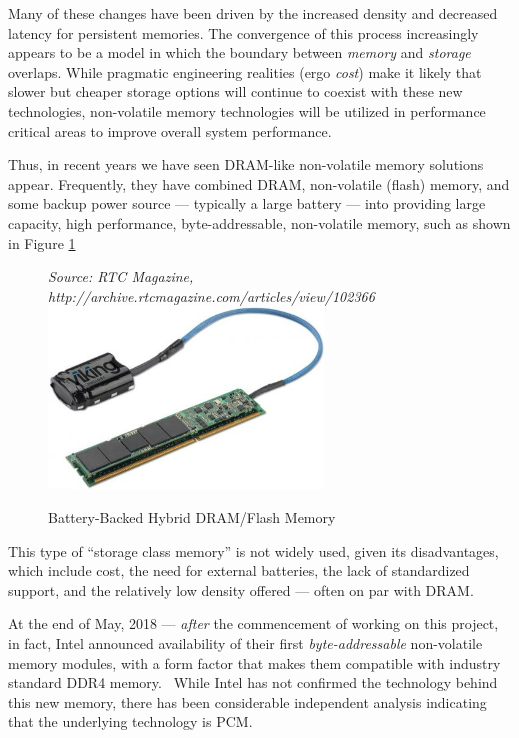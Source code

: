 Many of these changes have been driven by the increased density and decreased latency for
persistent memories. The convergence of this process increasingly appears to be a model
in which the boundary between \textit{memory} and \textit{storage} overlaps.  While
pragmatic engineering realities (ergo \textit{cost}) make it likely that slower but cheaper
storage options will continue to coexist with these new technologies, non-volatile memory
technologies will be utilized in performance critical areas to improve overall system performance.

Thus, in recent years we have seen \acs{DRAM}-like non-volatile memory solutions appear.  Frequently,
they have combined DRAM, non-volatile (flash) memory, and some backup power source ---
typically a large battery --- into providing large capacity, high performance, byte-addressable,
non-volatile memory, such as shown in Figure \ref{figure:scm}

\begin{figure}
    \centering
    \caption{Battery-Backed Hybrid DRAM/Flash Memory}\label{figure:scm}
    \emph{Source: RTC Magazine, http://archive.rtcmagazine.com/articles/view/102366}
    \includegraphics[width=0.65\textwidth]{figures/102366-2700_RTC11-PRTW-Viking-Fig1_medium.jpg}
\end{figure}

This type of ``storage class memory'' is not widely used, given its disadvantages, which include
cost, the need for external batteries, the lack of standardized support, and the relatively low
density offered --- often on par with \acs{DRAM}.

At the end of May, 2018 --- \textit{after} the commencement of working on this project, in fact,
Intel announced availability of their first \textit{byte-addressable} non-volatile memory modules,
with a form factor that makes them compatible with industry standard \acs{DDR4} 
memory.~\cite{anandtech:apache_pass}  While Intel has not confirmed the technology behind this
new memory, there has been considerable independent analysis indicating that the underlying
technology is \acs{PCM}.~\cite{malventano:2017:3DXPoint}

